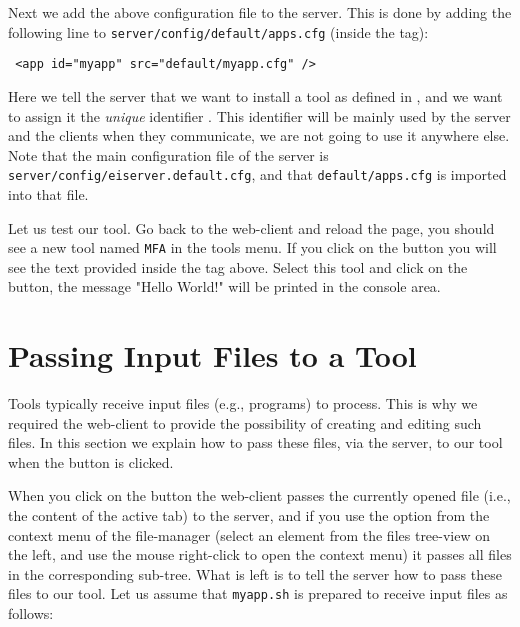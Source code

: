 Next we add the above configuration file to the server. This is done
by adding the following line to \texttt{server/config/default/apps.cfg}
(inside the  tag):

\medskip
\begin{lstlisting}
 <app id="myapp" src="default/myapp.cfg" />
\end{lstlisting}

\medskip
\noindent
Here we tell the server that we want to install a tool as defined in
, and we want to assign it the
\emph{unique} identifier . This identifier will
be mainly used by the server and the clients when they communicate, we
are not going to use it anywhere else.
%
Note that the main configuration file of the \ei server is
\texttt{server/config/eiserver.default.cfg}, and that
\texttt{default/apps.cfg} is imported into that file.

Let us test our tool. Go back to the web-client and reload the page,
you should see a new tool named \texttt{MFA} in the tools menu. If you
click on the \helpbutton button you will see the text provided inside
the  tag above.
%
Select this tool and click on the \applybutton button, the message
"Hello World!" will be printed in the console area.


\section{Passing Input Files to a Tool}

Tools typically receive input files (e.g., programs) to process. This
is why we required the web-client to provide the possibility of
creating and editing such files.  In this section we explain how to
pass these files, via the server, to our tool when the \applybutton
button is clicked.

When you click on the \applybutton button the web-client passes the
currently opened file (i.e., the content of the active tab) to the
server, and if you use the \applybutton option from the context menu
of the file-manager (select an element from the files tree-view on the
left, and use the mouse right-click to open the context menu) it
passes all files in the corresponding sub-tree.
%
What is left is to tell the server how to pass these files to our
tool. Let us assume that \texttt{myapp.sh} is prepared to
receive input files as follows:


